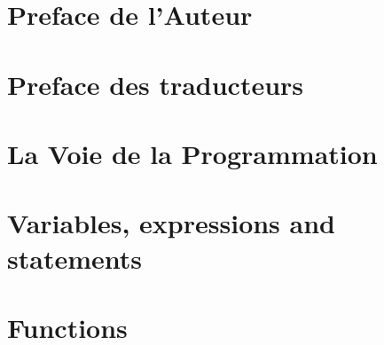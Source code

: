 \documentclass[french,10pt]{book}
\newcommand{\FR}{\color{blue} \normalsize}
\newcommand{\EN}{\color{red} \normalsize}
\newcommand{\UN}{\color{black}\normalsize}
\begin{document}

\EN

\FR
\chapter{Preface de l'Auteur}

\FR
\chapter{Preface des traducteurs}


\UN
\begin{latexonly}


\tableofcontents

\clearemptydoublepage

\end{latexonly}

\mainmatter

\FR
\chapter{La Voie de la Programmation}

\EN
\chapter{Variables, expressions and statements}

\EN
\chapter{Functions}

\EN
\end{document}
